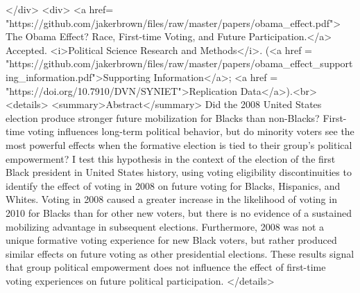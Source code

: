   </div>
  <div>
    <a href= "https://github.com/jakerbrown/files/raw/master/papers/obama_effect.pdf"> The Obama Effect? Race, First-time Voting, and Future Participation.</a> Accepted. <i>Political Science Research and Methods</i>. (<a href = "https://github.com/jakerbrown/files/raw/master/papers/obama_effect_supporting_information.pdf">Supporting Information</a>; <a href = "https://doi.org/10.7910/DVN/SYNIET">Replication Data</a>).<br><details>
      <summary>Abstract</summary>
      Did the 2008 United States election produce stronger future mobilization for Blacks than non-Blacks? First-time voting influences long-term political behavior, but do minority voters see the most powerful effects when the formative election is tied to their group’s political empowerment? I test this hypothesis in the context of the election of the first Black president in United States history, using voting eligibility discontinuities to identify the effect of voting in 2008 on future voting for Blacks, Hispanics, and Whites. Voting in 2008 caused a greater increase in the likelihood of voting in 2010 for Blacks than for other new voters, but there is no evidence of a sustained mobilizing advantage in subsequent elections. Furthermore, 2008 was not a unique formative voting experience for new Black voters, but rather  produced similar effects on future voting as other presidential elections. These results signal that group political empowerment does not influence the effect of first-time voting experiences on future political participation.
    </details>

